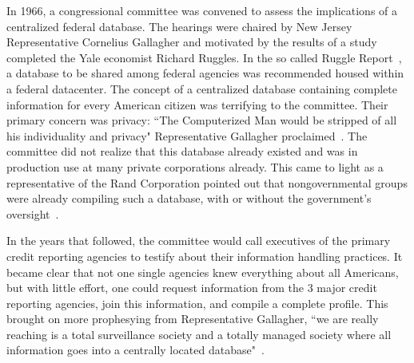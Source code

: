 In 1966, a congressional committee was convened to assess the implications of a
centralized federal database. The hearings were chaired by New Jersey
Representative Cornelius Gallagher and motivated by the results of a study
completed the Yale economist Richard Ruggles. In the so called Ruggle
Report~\cite{ruggles1965report}, a database to be shared among federal agencies
was recommended housed within a federal datacenter. The concept of a
centralized database containing complete information for every American citizen
was terrifying to the committee. Their primary concern was privacy: ``The
Computerized Man would be stripped of all his individuality and privacy"
Representative Gallagher proclaimed~\cite{ruggles1965report}. The committee did
not realize that this database already existed and was in production use at
many private corporations already. This came to light as a representative of
the Rand Corporation pointed out that nongovernmental groups were already
compiling such a database, with or without the government's
oversight~\cite{congress1967privacy}.

In the years that followed, the committee would call executives of the primary
credit reporting agencies to testify about their information handling
practices. It became clear that not one single agencies knew everything about
all Americans, but with little effort, one could request information from the 3
major credit reporting agencies, join this information, and compile a complete
profile. This brought on more prophesying from Representative Gallagher, ``we
are really reaching is a total surveillance society and a totally managed
society where all information goes into a centrally located
database"~\cite{congress1967privacy}.

